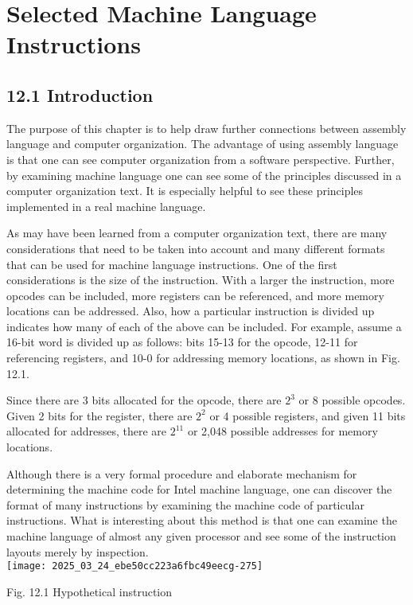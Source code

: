 \documentclass[10pt]{article}
\begin{document}
\section*{Selected Machine Language Instructions}
\subsection*{12.1 Introduction}
The purpose of this chapter is to help draw further connections between assembly language and computer organization. The advantage of using assembly language is that one can see computer organization from a software perspective. Further, by examining machine language one can see some of the principles discussed in a computer organization text. It is especially helpful to see these principles implemented in a real machine language.

As may have been learned from a computer organization text, there are many considerations that need to be taken into account and many different formats that can be used for machine language instructions. One of the first considerations is the size of the instruction. With a larger the instruction, more opcodes can be included, more registers can be referenced, and more memory locations can be addressed. Also, how a particular instruction is divided up indicates how many of each of the above can be included. For example, assume a 16-bit word is divided up as follows: bits 15-13 for the opcode, 12-11 for referencing registers, and 10-0 for addressing memory locations, as shown in Fig. 12.1.

Since there are 3 bits allocated for the opcode, there are $2^{3}$ or 8 possible opcodes. Given 2 bits for the register, there are $2^{2}$ or 4 possible registers, and given 11 bits allocated for addresses, there are $2^{11}$ or 2,048 possible addresses for memory locations.

Although there is a very formal procedure and elaborate mechanism for determining the machine code for Intel machine language, one can discover the format of many instructions by examining the machine code of particular instructions. What is interesting about this method is that one can examine the machine language of almost any given processor and see some of the instruction layouts merely by inspection.\\
\texttt{[image: 2025\_03\_24\_ebe50cc223a6fbc49eecg-275]}

Fig. 12.1 Hypothetical instruction
\end{document}

